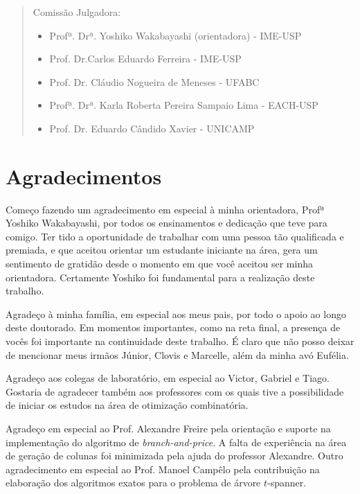 \documentclass[12pt,twoside,a4paper]{book}
\begin{document}
     \begin{quote}
     \noindent Comissão Julgadora:
    
     \begin{itemize}
 		\item Profª. Drª. Yoshiko Wakabayashi (orientadora) - IME-USP
 		\item Prof. Dr.Carlos Eduardo Ferreira - IME-USP
 		\item Prof. Dr. Cláudio Nogueira de Meneses - UFABC
		\item Profª. Drª. Karla Roberta Pereira Sampaio Lima - EACH-USP
		\item Prof. Dr. Eduardo Cândido Xavier - UNICAMP
     \end{itemize}
      
     \end{quote}
 \pagebreak



\chapter*{Agradecimentos}
Começo fazendo um agradecimento em especial à minha orientadora,
Profª Yoshiko Wakabayashi, por todos os ensinamentos e dedicação que teve
para comigo. Ter tido a oportunidade de trabalhar com uma pessoa tão
qualificada e premiada, e que aceitou orientar um estudante
iniciante na área, gera um sentimento de gratidão 
desde o momento em que você aceitou ser minha orientadora. 
Certamente Yoshiko foi fundamental para a realização deste trabalho.


Agradeço à minha família, em especial aos meus pais, por todo o apoio ao
longo deste doutorado. Em momentos importantes, como na reta final, a
presença de vocês foi importante na continuidade deste trabalho. É claro que
não posso deixar de mencionar meus irmãos Júnior, Clovis e Marcelle, além
da minha avó Eufélia.

Agradeço aos colegas de laboratório, em especial ao Victor, Gabriel e Tiago.
Gostaria de agradecer também aos professores com os quais tive a possibilidade
de iniciar os estudos na área de otimização combinatória.

Agradeço em especial ao Prof. Alexandre Freire pela orientação e suporte
na implementação do algoritmo de \emph{branch-and-price}. A falta de
experiência na área de geração de colunas 
foi minimizada pela ajuda do professor Alexandre. Outro
agradecimento em especial ao Prof. Manoel Campêlo pela contribuição na
elaboração dos algoritmos exatos para o problema de árvore $t$-spanner.
\end{document}
